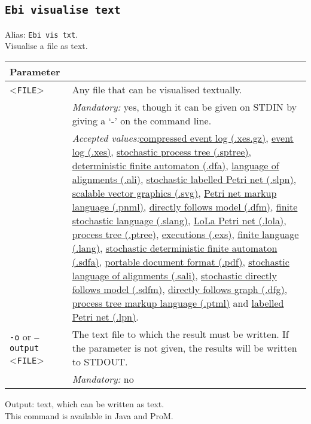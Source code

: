 {\subsection{\texttt{Ebi visualise text}}
\label{command:Ebi visualise text}
Alias: \texttt{Ebi vis txt}.\\
Visualise a file as text.\\
\begin{tabularx}{\linewidth}{lX}
\toprule
Parameter \\\midrule
<\texttt{FILE}>&Any file that can be visualised textually.\\
&\textit{Mandatory:} \quad yes, though it can be given on STDIN by giving a `-' on the command line.\\
&\textit{Accepted values:}\quad \hyperref[filehandler:compressed event log]{compressed event log (.xes.gz)}, \hyperref[filehandler:event log]{event log (.xes)}, \hyperref[filehandler:stochastic process tree]{stochastic process tree (.sptree)}, \hyperref[filehandler:deterministic finite automaton]{deterministic finite automaton (.dfa)}, \hyperref[filehandler:language of alignments]{language of alignments (.ali)}, \hyperref[filehandler:stochastic labelled Petri net]{stochastic labelled Petri net (.slpn)}, \hyperref[filehandler:scalable vector graphics]{scalable vector graphics (.svg)}, \hyperref[filehandler:Petri net markup language]{Petri net markup language (.pnml)}, \hyperref[filehandler:directly follows model]{directly follows model (.dfm)}, \hyperref[filehandler:finite stochastic language]{finite stochastic language (.slang)}, \hyperref[filehandler:LoLa Petri net]{LoLa Petri net (.lola)}, \hyperref[filehandler:process tree]{process tree (.ptree)}, \hyperref[filehandler:executions]{executions (.exs)}, \hyperref[filehandler:finite language]{finite language (.lang)}, \hyperref[filehandler:stochastic deterministic finite automaton]{stochastic deterministic finite automaton (.sdfa)}, \hyperref[filehandler:portable document format]{portable document format (.pdf)}, \hyperref[filehandler:stochastic language of alignments]{stochastic language of alignments (.sali)}, \hyperref[filehandler:stochastic directly follows model]{stochastic directly follows model (.sdfm)}, \hyperref[filehandler:directly follows graph]{directly follows graph (.dfg)}, \hyperref[filehandler:process tree markup language]{process tree markup language (.ptml)} and \hyperref[filehandler:labelled Petri net]{labelled Petri net (.lpn)}.\\
\texttt{-o} or \texttt{--output} <\texttt{FILE}> &
The text file to which the result must be written. If the parameter is not given, the results will be written to STDOUT.\\
&\textit{Mandatory:} \quad no\\
\bottomrule
\end{tabularx}
\noindent Output: text, which can be written as  text.
\\This command is available in Java and ProM.
}
